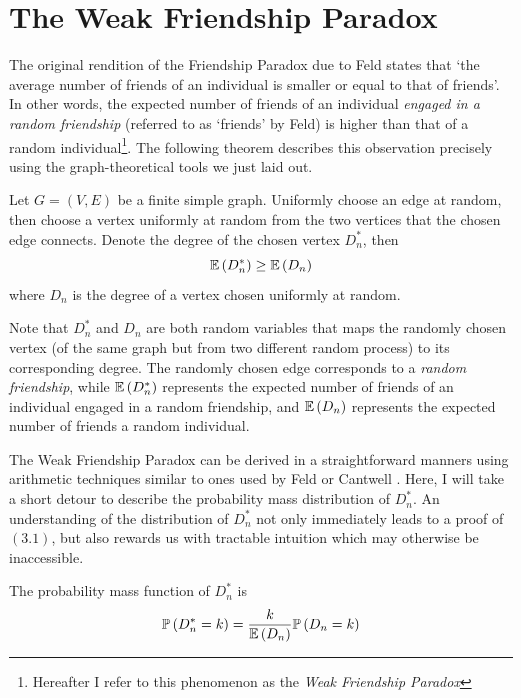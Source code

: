 \documentclass[12pt,reqno, a4]{amsart}
\begin{document}
\section{The Weak Friendship Paradox}
The original rendition of the Friendship Paradox due to Feld \cite{feld_why_1991} states that `the average number of friends of an individual is smaller or equal to that of friends'. In other words, the expected number of friends of an individual \textit{engaged in a random friendship} (referred to as `friends' by Feld) is higher than that of a random individual\footnote{Hereafter I refer to this phenomenon as the \textit{Weak Friendship Paradox}}. The following theorem describes this observation precisely using the graph-theoretical tools we just laid out.
\begin{theorem} \label{thm:1}
    Let $G = (V, E)$ be a finite simple graph. Uniformly choose an edge at random, then choose a vertex uniformly at random from the two vertices that the chosen edge connects. Denote the degree of the chosen vertex $D_n^*$, then 
    \begin{equation}
        \mathbb{E}\left( D_n^* \right) \geq \mathbb{E}\left( D_n \right)
    \end{equation}
    where $D_n$ is the degree of a vertex chosen uniformly at random.
\end{theorem}
\begin{remark}
    Note that $D_n^*$ and $D_n$ are both random variables that maps the randomly chosen vertex (of the same graph but from two different random process) to its corresponding degree. The randomly chosen edge corresponds to a \textit{random friendship}, while $\mathbb{E}\left( D_n^* \right)$ represents the expected number of friends of an individual engaged in a random friendship, and $\mathbb{E}\left( D_n \right)$ represents the expected number of friends a random individual. 
\end{remark}
The Weak Friendship Paradox can be derived in a straightforward manners using arithmetic techniques similar to ones used by Feld \autocite{feld_why_1991} or Cantwell \cite{cantwell_friendship_2021}. Here, I will take a short detour to describe the probability mass distribution of $D_n^*$. An understanding of the distribution of $D_n^*$ not only immediately leads to a proof of $(3.1)$, but also rewards us with tractable intuition which may otherwise be inaccessible.
\begin{lemma} \label{thm: lemma 1}
     The probability mass function of $D_n^*$ is 
    \begin{equation}
        \mathbb{P}\left (D_n^* = k \right) = \frac{k}{\mathbb{E}\left( D_n \right)} \mathbb{P}\left (D_n = k \right) 
    \end{equation}
\end{lemma}
\end{document}
